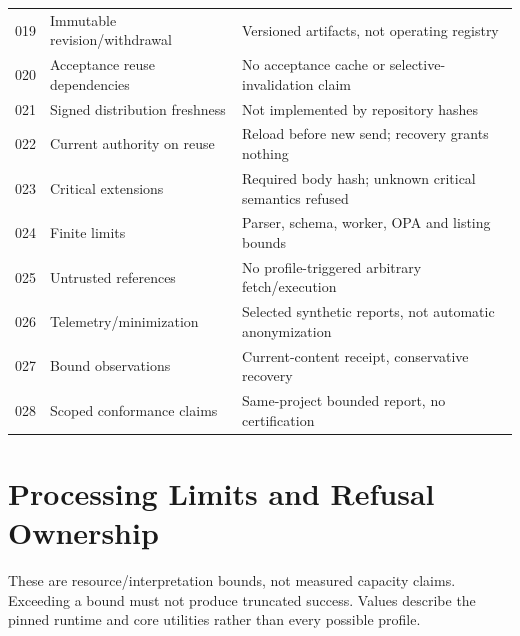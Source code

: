 \documentclass[11pt,letterpaper]{article}
\begin{document}
\begin{longtable}{@{}L{.09\linewidth}L{.35\linewidth}L{.49\linewidth}@{}}
019 & Immutable revision/withdrawal & Versioned artifacts, not operating registry \\
020 & Acceptance reuse dependencies & No acceptance cache or selective-invalidation claim \\
021 & Signed distribution freshness & Not implemented by repository hashes \\
022 & Current authority on reuse & Reload before new send; recovery grants nothing \\
023 & Critical extensions & Required body hash; unknown critical semantics refused \\
024 & Finite limits & Parser, schema, worker, OPA and listing bounds \\
025 & Untrusted references & No profile-triggered arbitrary fetch/execution \\
026 & Telemetry/minimization & Selected synthetic reports, not automatic anonymization \\
027 & Bound observations & Current-content receipt, conservative recovery \\
028 & Scoped conformance claims & Same-project bounded report, no certification \\
\bottomrule
\end{longtable}

\section{Processing Limits and Refusal Ownership}

These are resource/interpretation bounds, not measured capacity claims. Exceeding
a bound must not produce truncated success. Values describe the pinned runtime
and core utilities rather than every possible profile.
\end{document}
